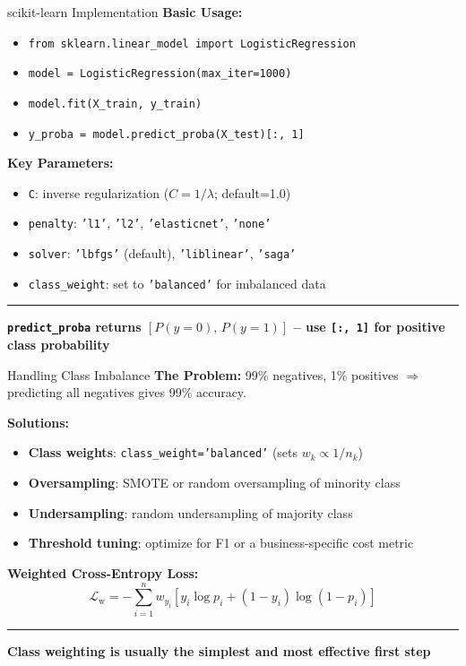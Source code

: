 \documentclass[8pt,aspectratio=169]{beamer}
\newcommand{\bottomnote}[1]{%
\vfill
\vspace{-2mm}
\textcolor{mllavender2}{\rule{\textwidth}{0.4pt}}
\vspace{1mm}
\footnotesize
\textbf{#1}
}
\begin{document}
\begin{frame}[t]{scikit-learn Implementation}
\textbf{Basic Usage:}
\begin{itemize}
\item \texttt{from sklearn.linear\_model import LogisticRegression}
\item \texttt{model = LogisticRegression(max\_iter=1000)}
\item \texttt{model.fit(X\_train, y\_train)}
\item \texttt{y\_proba = model.predict\_proba(X\_test)[:, 1]}
\end{itemize}
\vspace{0.5em}
\textbf{Key Parameters:}
\begin{itemize}
\item \texttt{C}: inverse regularization ($C = 1/\lambda$; default=1.0)
\item \texttt{penalty}: \texttt{'l1'}, \texttt{'l2'}, \texttt{'elasticnet'}, \texttt{'none'}
\item \texttt{solver}: \texttt{'lbfgs'} (default), \texttt{'liblinear'}, \texttt{'saga'}
\item \texttt{class\_weight}: set to \texttt{'balanced'} for imbalanced data
\end{itemize}
\bottomnote{\texttt{predict\_proba} returns $[P(y\!=\!0),\, P(y\!=\!1)]$ -- use \texttt{[:, 1]} for positive class probability}
\end{frame}

\begin{frame}[t]{Handling Class Imbalance}
\textbf{The Problem:} 99\% negatives, 1\% positives $\Rightarrow$ predicting all negatives gives 99\% accuracy.

\vspace{0.5em}
\textbf{Solutions:}
\begin{itemize}
\item \textbf{Class weights}: \texttt{class\_weight='balanced'} (sets $w_k \propto 1/n_k$)
\item \textbf{Oversampling}: SMOTE or random oversampling of minority class
\item \textbf{Undersampling}: random undersampling of majority class
\item \textbf{Threshold tuning}: optimize for F1 or a business-specific cost metric
\end{itemize}
\vspace{0.3em}
\textbf{Weighted Cross-Entropy Loss:}
$$\mathcal{L}_{\text{w}} = -\sum_{i=1}^{n} w_{y_i}\!\left[y_i\log p_i + (1-y_i)\log(1-p_i)\right]$$
\bottomnote{Class weighting is usually the simplest and most effective first step}
\end{frame}
\end{document}
